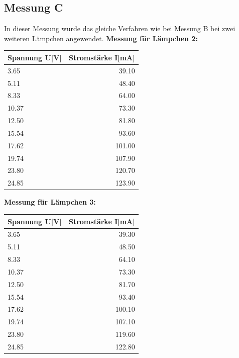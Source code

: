 \documentclass[12pt, a4paper, twoside]{article}
\begin{document}
    \subsection{Messung C}
    In dieser Messung wurde das gleiche Verfahren wie bei Messung B bei zwei weiteren Lämpchen angewendet.
    \newpage
    \textbf{Messung für Lämpchen 2:}\\
    \begin{center}
        \begin{tabular}{l|r}
            \textbf{Spannung U[V]} & \textbf{Stromstärke I[mA]}\\
            \hline
            3.65 & 39.10\\
            5.11 & 48.40\\
            8.33 & 64.00\\
            10.37 & 73.30\\
            12.50 & 81.80\\
            15.54 & 93.60\\
            17.62 & 101.00\\
            19.74 & 107.90\\
            23.80 & 120.70\\
            24.85 & 123.90
        \end{tabular}
    \end{center}
    \vspace{1cm}
    \textbf{Messung für Lämpchen 3:}\\
    \begin{center}
        \begin{tabular}{l|r}
            \textbf{Spannung U[V]} & \textbf{Stromstärke I[mA]}\\
            \hline
            3.65 & 39.30\\
            5.11 & 48.50\\
            8.33 & 64.10\\
            10.37 & 73.30\\
            12.50 & 81.70\\
            15.54 & 93.40\\
            17.62 & 100.10\\
            19.74 & 107.10\\
            23.80 & 119.60\\
            24.85 & 122.80
        \end{tabular}
    \end{center}
\end{document}

